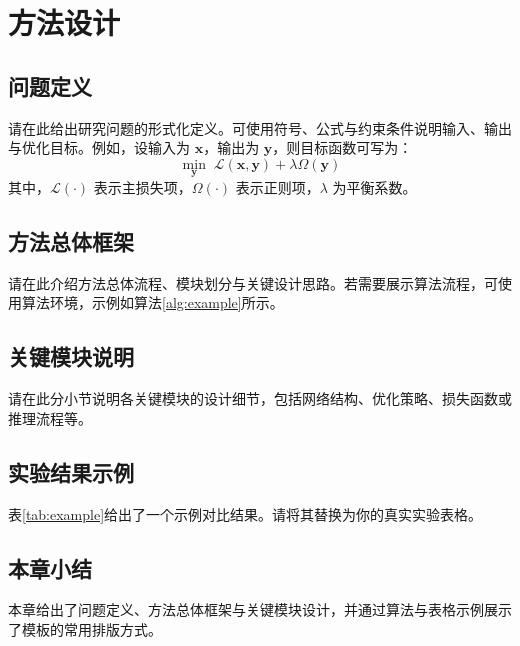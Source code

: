 \chapter{方法设计}
\section{问题定义}

请在此给出研究问题的形式化定义。可使用符号、公式与约束条件说明输入、输出与优化目标。例如，设输入为 $\mathbf{x}$，输出为 $\mathbf{y}$，则目标函数可写为：
\begin{equation}
    \min_{\mathbf{y}} \; \mathcal{L}(\mathbf{x}, \mathbf{y}) + \lambda \Omega(\mathbf{y})
    \label{eq:objective}
\end{equation}
其中，$\mathcal{L}(\cdot)$ 表示主损失项，$\Omega(\cdot)$ 表示正则项，$\lambda$ 为平衡系数。

\section{方法总体框架}

请在此介绍方法总体流程、模块划分与关键设计思路。若需要展示算法流程，可使用算法环境，示例如算法\ref{alg:example}所示。



\section{关键模块说明}

请在此分小节说明各关键模块的设计细节，包括网络结构、优化策略、损失函数或推理流程等。

\section{实验结果示例}

表\ref{tab:example}给出了一个示例对比结果。请将其替换为你的真实实验表格。



\section{本章小结}

本章给出了问题定义、方法总体框架与关键模块设计，并通过算法与表格示例展示了模板的常用排版方式。
